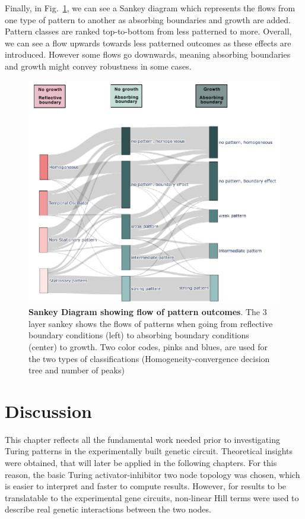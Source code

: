 Finally, in Fig.~\ref{fig:3layer_sankey}, we can see a Sankey diagram which represents the flows from one type of pattern to another as absorbing boundaries and growth are added.
Pattern classes are ranked top-to-bottom from less patterned to more.
Overall, we can see a flow upwards towards less patterned outcomes as these effects are introduced.
However some flows go downwards, meaning absorbing boundaries and growth might convey robustness in some cases.

\begin{figure}[H] %
    \centering
    \begin{adjustbox}{center}
        \includegraphics[width=1\textwidth]{chapters/Chapter 1/3layer_sankey} %
    \end{adjustbox}
    \caption{\textbf{Sankey Diagram showing flow of pattern outcomes}. The 3 layer sankey shows the flows of patterns when going from reflective boundary conditions (left) to absorbing boundary conditions (center) to growth. Two color codes, pinks and blues, are used for the two types of classifications (Homogeneity-convergence decision tree and number of peaks)}
    \label{fig:3layer_sankey} %
\end{figure}


\section{Discussion}
This chapter reflects all the fundamental work needed prior to investigating Turing patterns in the experimentally built genetic circuit.
Theoretical insights were obtained, that will later be applied in the following chapters.
For this reason, the basic Turing activator-inhibitor two node topology was chosen, which is easier to interpret and faster to compute results.
However, for results to be translatable to the experimental gene circuits, non-linear Hill terms were used to describe real genetic interactions between the two nodes.

